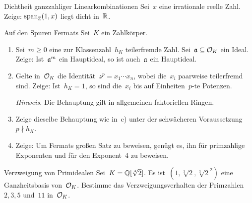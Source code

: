 \documentclass[entwurf]{uebblatt}
\begin{document}

\begin{aufgabe}{Dichtheit ganzzahliger Linearkombinationen}
Sei~$x$ eine irrationale reelle Zahl. Zeige: $\operatorname{span}_{\mathbb{Z}}(1,x)$
liegt dicht in~$\mathbb{R}$.
\end{aufgabe}

\begin{aufgabe}{Auf den Spuren Fermats}
Sei~$K$ ein Zahlkörper.
\begin{enumerate}
\item Sei~$m \geq 0$ eine zur Klassenzahl~$h_K$
teilerfremde Zahl. Sei~$\mathfrak{a} \subseteq \mathcal{O}_K$ ein Ideal. Zeige: Ist~$\mathfrak{a}^m$ ein
Hauptideal, so ist auch~$\mathfrak{a}$ ein Hauptideal.
\item Gelte in~$\mathcal{O}_K$ die Identität~$z^p = x_1 \cdots x_n$,
wobei die~$x_i$ paarweise teilerfremd sind. Zeige: Ist~$h_K = 1$,
so sind die~$x_i$ bis auf Einheiten~$p$-te Potenzen.

{\tiny\emph{Hinweis.} Die Behauptung gilt in allgemeinen faktoriellen
Ringen.\par}
\item Zeige dieselbe Behauptung wie in~c) unter der schwächeren Voraussetzung~$p \nmid h_K$.
\item Zeige: Um Fermats großen Satz zu beweisen, genügt es, ihn für primzahlige
Exponenten und für den Exponent~4 zu beweisen.
\end{enumerate}
\end{aufgabe}

\begin{aufgabe}{Verzweigung von Primidealen}
Sei~$K = \mathbb{Q}[\sqrt[3]{2}]$. Es ist~$(1,\sqrt[3]{2},\sqrt[3]{2}^2)$ eine
Ganzheitsbasis von~$\mathcal{O}_K$. Bestimme das Verzweigungsverhalten der
Primzahlen~$2, 3, 5$ und~$11$ in~$\mathcal{O}_K$.
\end{aufgabe}
\end{document}
